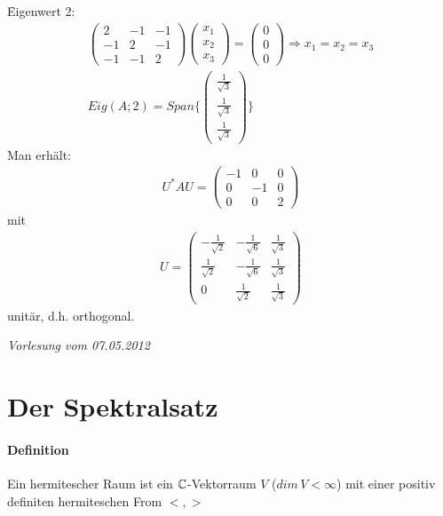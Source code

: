 \begin{itemize}
\f{Eigenwert 2}:
\begin{align}
\begin{pmatrix} 2 & -1 & -1 \\ -1 & 2 & -1 \\ -1 & -1 & 2 \end{pmatrix} \begin{pmatrix} x_1 \\ x_2 \\ x_3 \end{pmatrix} = \begin{pmatrix} 0 \\ 0 \\ 0 \end{pmatrix} \Rightarrow x_1 = x_2 = x_3 \\
Eig(A; 2) = Span \{ \begin{pmatrix} \frac{1}{\sqrt{3}} \\ \frac{1}{\sqrt{3}} \\ \frac{1}{\sqrt{3}} \end{pmatrix} \}
\end{align}
Man erhält:
\begin{align}
U^{*} A U = \begin{pmatrix} -1 & 0 & 0 \\ 0 & -1 & 0 \\ 0 & 0 & 2 \end{pmatrix}
\end{align}
mit
\begin{align}
U = \begin{pmatrix} -\frac{1}{\sqrt{2}} & -\frac{1}{\sqrt{6}} & \frac{1}{\sqrt{3}} \\ \frac{1}{\sqrt{2}} & -\frac{1}{\sqrt{6}} & \frac{1}{\sqrt{3}} \\ 0 & \frac{1}{\sqrt{2}} & \frac{1}{\sqrt{3}} \end{pmatrix}
\end{align}
unitär, d.h. orthogonal.
\end{itemize}

\newpage
\noindent \textit{Vorlesung vom 07.05.2012}
\section{Der Spektralsatz} %
\normalsize

\paragraph{Definition}
Ein hermitescher Raum ist ein $\mathbb{C}$-Vektorraum $V$ ($dim\, V < \infty$) mit einer positiv definiten hermiteschen From $<, >$
